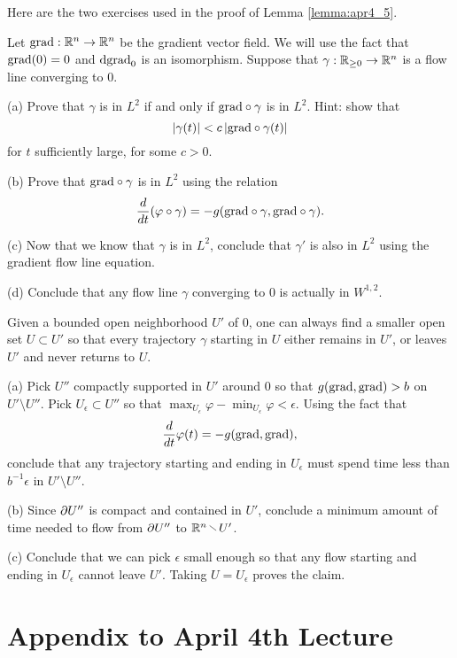 Here are the two exercises used in the proof of Lemma \ref{lemma:apr4_5}.
\begin{xca}\label{xca:apr4_3}
  Let $\mathrm{grad}:\mathbb{R}^{n}\to \mathbb{R}^{n}$ be the gradient vector field. We will use the fact that $\mathrm{grad}(0)=0$ and $\mathrm{d} \mathrm{grad}_{0}$ is an isomorphism. Suppose that $\gamma:\mathbb{R}_{\ge 0}\to \mathbb{R}^{n}$ is a flow line converging to $0$.

  (a) Prove that $\gamma$ is in $L^{2}$ if and only if $\mathrm{grad}\circ \gamma$ is in $L^{2}$. Hint: show that $$\left|\gamma(t)\right|<c\left|\mathrm{grad}\circ \gamma(t)\right|$$ for $t$ sufficiently large, for some $c>0$.

  (b) Prove that $\mathrm{grad}\circ \gamma$ is in $L^{2}$ using the relation
  \begin{equation*}
    \frac{d}{dt}(\varphi\circ \gamma)=-g(\mathrm{grad}\circ \gamma,\mathrm{grad}\circ \gamma).
  \end{equation*}

  (c) Now that we know that $\gamma$ is in $L^{2}$, conclude that $\gamma'$ is also in $L^{2}$ using the gradient flow line equation.

  (d) Conclude that any flow line $\gamma$ converging to $0$ is actually in $W^{1,2}$.
\end{xca}
\begin{xca}\label{xca:apr4_4}
  Given a bounded open neighborhood $U'$ of $0$, one can always find a smaller open set $U\subset U'$ so that every trajectory $\gamma$ starting in $U$ either remains in $U'$, or leaves $U'$ and never returns to $U$.

  (a) Pick $U''$ compactly supported in $U'$ around $0$ so that $g(\mathrm{grad},\mathrm{grad})>b$ on $U'\setminus U''$. Pick $U_{\epsilon}\subset U''$ so that $\max_{U_{\epsilon}} \varphi-\min_{U_{\epsilon}}\varphi<\epsilon$. Using the fact that
  \begin{equation*}
    \frac{d}{dt}\varphi(t)=-g(\mathrm{grad},\mathrm{grad}),
  \end{equation*}
  conclude that any trajectory starting and ending in $U_{\epsilon}$ must spend time less than $b^{-1}\epsilon$ in $U'\setminus U''$.

  (b) Since $\partial U''$ is compact and contained in $U'$, conclude a minimum amount of time needed to flow from $\partial U''$ to $\R^{n}\setminus U'$.

  (c) Conclude that we can pick $\epsilon$ small enough so that any flow starting and ending in $U_{\epsilon}$ cannot leave $U'$. Taking $U=U_{\epsilon}$ proves the claim. 
\end{xca}

\section*{\textbf{Appendix to April 4th Lecture}}


